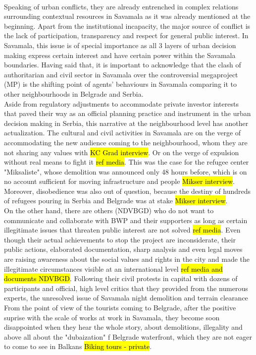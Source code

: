 \documentclass[11pt]{report}
\begin{document}
\\
Speaking of urban conflicts, they are already entrenched in complex relations surrounding contextual resources in Savamala as it was already mentioned at the beginning.
Apart from the institutional incapacity, the major source of conflict is the lack of participation, transparency and respect for general public interest. In Savamala, this issue is of special importance as all 3 layers of urban decision making express certain interest and have certain power within the Savamala boundaries.
Having said that, it is important to acknowledge that the clash of authoritarian and civil sector in Savamala over the controversial megaproject (MP) is the shifting point of agents' behaviours in Savamala comparing it to other neighbourhoods in Belgrade and Serbia.
\\
Aside from regulatory adjustments to accommodate private investor interests that paved their way as an official planning practice and instrument in the urban decision making in Serbia, this narrative at the neighbourhood level has another actualization.
The cultural and civil activities in Savamala are on the verge of accommodating the new audience coming to the neighbourhood, whom they are not sharing any values with \hl{KC Grad interview}.
Or on the verge of expulsion without real means to fight it \hl{ref media}. 
This was the case for the refugee center "Miksaliste", whose demolition was announced only 48 hours before, which is on no account sufficient for moving infrastructure and people \hl{Mikser interview}. Moreover, disobedience was also out of question, because  the destiny of hundreds of refugees pouring in Serbia and Belgrade was at stake \hl{Mikser interview}.
\\
On the other hand, there are others (NDVBGD) who do not want to communicate and collaborate with BWP and their supporters as long as certain illegitimate issues that threaten public interest are not solved \hl{ref media}.
Even though their actual achievements to stop the project are inconsiderate, their public actions, elaborated documentation, sharp analysis and even legal moves are raising awareness about the social values and rights in the city and made the illegitimate circumstances visible at an international level \hl{ref media and documents NDVBGD}.
Following their civil protests in capital with dozens of participants and official, high level critics that they provided from the numerous experts, the unresolved issue of Savamala night demolition and terrain clearance \footnotemark
From the point of view of the tourists coming to Belgrade, after the positive suprise with the scale of works at work in Savamala, they become soon disappointed when they hear the whole story, about demolitions, illegality and above all about the "dubaization" f Belgrade waterfront, which they are not eager to come to see in Balkans \hl{Biking tours - private}.
\end{document}
